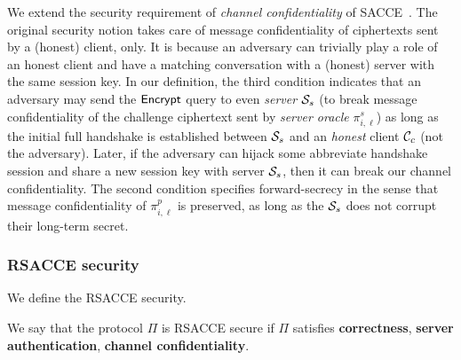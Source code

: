 \begin{remark}
We extend the security requirement of
\textit{channel confidentiality} of SACCE~\cite{KPW13:SACCE}.
The original security notion takes care of message
confidentiality of ciphertexts sent by a (honest)
client, only. It is because an adversary can trivially
play a role of an honest client and have a matching
conversation with a (honest) server with the same
session key. In our definition, the third condition
indicates that an adversary may send the $\mathsf{Encrypt}$
query to even \textit{server} $\mathcal{S}_s$ (to break
message confidentiality of the challenge ciphertext
sent by \textit{server oracle} $\pi^s_{i,\ell}$) as
long as the initial full handshake is established
between $\mathcal{S}_s$ and an \textit{honest} client
$\mathcal{C}_c$ (not the adversary). Later, if the
adversary can hijack some abbreviate handshake session
and share a new session key with server $\mathcal{S}_s$,
then it can break our channel confidentiality.
The second condition specifies forward-secrecy in the
sense that message confidentiality of $\pi^p_{i,\ell}$
is preserved, as long as the $\mathcal{S}_s$ does not
corrupt their long-term secret.
\end{remark}

\subsubsection{RSACCE security}
We define the RSACCE security.

\begin{definition}
 We say that the protocol $\Pi$ is RSACCE secure
 if $\Pi$ satisfies \textbf{correctness},
 \textbf{server authentication},
 \textbf{channel confidentiality}.
\end{definition}